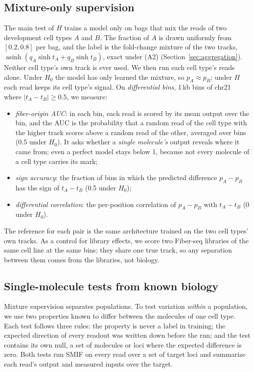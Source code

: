 \documentclass[acmtog,nonacm]{acmart}   %
\begin{document}
\subsection{Mixture-only supervision}
\label{sec:eval-mixture}

The main test of $H$ trains a model only on bags that mix the reads of two development cell types $A$ and $B$.
The fraction of $A$ is drawn uniformly from $[0.2,0.8]$ per bag, and the label is the fold-change mixture of the two
tracks, $\operatorname{asinh}(q_A\sinh t_A+q_B\sinh t_B)$, exact under (A2) (Section~\ref{sec:aggregation}). Neither
cell type's own track is ever used. We then run each cell type's reads alone. Under $H_0$ the model has only learned
the mixture, so $p_A\approx p_B$; under $H$ each read keeps its cell type's signal. On \emph{differential bins},
1\,kb bins of chr21 where $|t_A-t_B|\ge0.5$, we measure:
\begin{itemize}
  \item \emph{fiber-origin AUC}: in each bin, each read is scored by its mean output over the bin, and the AUC is
    the probability that a random read of the cell type with the higher track scores above a random read of the
    other, averaged over bins (0.5 under $H_0$). It asks whether a \emph{single molecule's} output reveals where
    it came from; even a perfect model stays below 1, because not every molecule of a cell type carries its mark;
  \item \emph{sign accuracy}: the fraction of bins in which the predicted difference $p_A-p_B$ has the sign of
    $t_A-t_B$ (0.5 under $H_0$);
  \item \emph{differential correlation}: the per-position correlation of $p_A-p_B$ with $t_A-t_B$ (0 under $H_0$).
\end{itemize}
The reference for each pair is the same architecture trained on the two cell types' own tracks. As a control for
library effects, we score two Fiber-seq libraries of the same cell line at the same bins; they share one true
track, so any separation between them comes from the libraries, not biology.

\subsection{Single-molecule tests from known biology}
\label{sec:eval-biology}

Mixture supervision separates populations. To test variation \emph{within} a population, we use two properties
known to differ between the molecules of one cell type. Each test follows three rules: the property is never a
label in training; the expected direction of every readout was written down before the run; and the test contains
its own null, a set of molecules or loci where the expected difference is zero. Both tests run SMIF on every read
over a set of target loci and summarize each read's output and measured inputs over the target.
\end{document}
